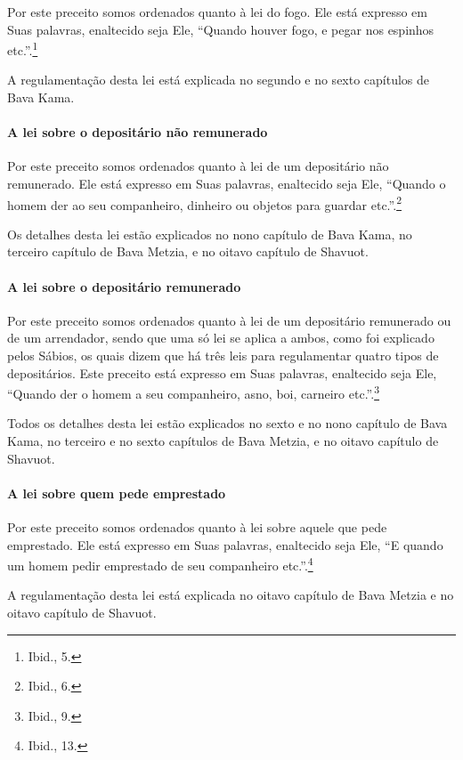 \begin{multicols}{2}
Por este preceito somos ordenados quanto à lei do fogo. Ele está
expresso em Suas palavras, enaltecido seja Ele, ``Quando houver fogo, e
pegar nos espinhos etc.''.\footnote{Ibid., 5.}

A regulamentação desta lei está explicada no segundo e no sexto
capítulos de Bava Kama\starr.

\paragraph{A lei sobre o depositário não remunerado}

Por este preceito somos ordenados quanto à lei de um depositário não
remunerado. Ele está expresso em Suas palavras, enaltecido seja Ele,
``Quando o homem der ao seu companheiro, dinheiro ou objetos para
guardar etc.''.\footnote{Ibid., 6.}

Os detalhes desta lei estão explicados no nono capítulo de Bava Kama\starr,
no terceiro capítulo de Bava Metzia\starr, e no oitavo capítulo de Shavuot\starr.

\paragraph{A lei sobre o depositário remunerado}

Por este preceito somos ordenados quanto à lei de um depositário
remunerado ou de um arrendador, sendo que uma só lei se aplica a ambos,
como foi explicado pelos Sábios, os quais dizem que há três leis para
regulamentar quatro tipos de depositários. Este preceito está expresso
em Suas palavras, enaltecido seja Ele, ``Quando der o homem a seu
companheiro, asno, boi, carneiro etc.''.\footnote{Ibid., 9.}

Todos os detalhes desta lei estão explicados no sexto e no nono
capítulo de Bava Kama\starr, no terceiro e no sexto capítulos de Bava
Metzia\starr, e no oitavo capítulo de Shavuot\starr.

\paragraph{A lei sobre quem pede emprestado}

Por este preceito somos ordenados quanto à lei sobre aquele que pede
emprestado. Ele está expresso em Suas palavras, enaltecido seja Ele, ``E
quando um homem pedir emprestado de seu companheiro etc.''.\footnote{Ibid.,
13.}

A regulamentação desta lei está explicada no oitavo capítulo de Bava
Metzia\starr{} e no oitavo capítulo de Shavuot\starr.


\end{multicols}
